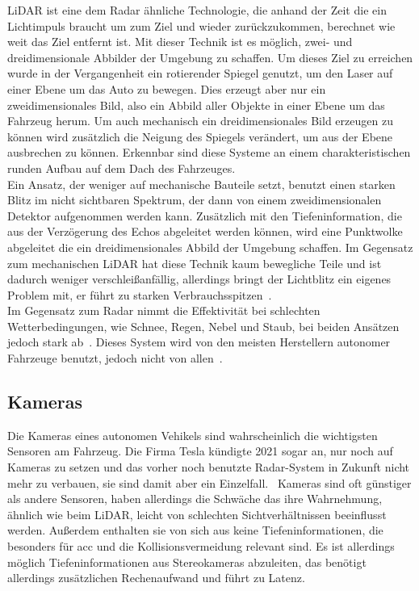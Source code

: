 \documentclass[conference,compsoc,final,a4paper]{IEEEtran}
\begin{document}
\ac{LiDAR} ist eine dem Radar ähnliche Technologie, die anhand der Zeit die ein Lichtimpuls braucht um zum Ziel und wieder zurückzukommen, berechnet wie weit das Ziel entfernt ist.
Mit dieser Technik ist es möglich, zwei- und dreidimensionale Abbilder der Umgebung zu schaffen.
Um dieses Ziel zu erreichen wurde in der Vergangenheit ein rotierender Spiegel genutzt, um den Laser auf einer Ebene um das Auto zu bewegen.
Dies erzeugt aber nur ein zweidimensionales Bild, also ein Abbild aller Objekte in einer Ebene um das Fahrzeug herum.
Um auch mechanisch ein dreidimensionales Bild erzeugen zu können wird zusätzlich die Neigung des Spiegels verändert, um aus der Ebene ausbrechen zu können.
Erkennbar sind diese Systeme an einem charakteristischen runden Aufbau auf dem Dach des Fahrzeuges.\\
Ein Ansatz, der weniger auf mechanische Bauteile setzt, benutzt einen starken Blitz im nicht sichtbaren Spektrum, der dann von einem zweidimensionalen Detektor aufgenommen werden kann.
Zusätzlich mit den Tiefeninformation, die aus der Verzögerung des Echos abgeleitet werden können, wird eine Punktwolke abgeleitet die ein dreidimensionales Abbild der Umgebung
schaffen. Im Gegensatz zum mechanischen \ac{LiDAR} hat diese Technik kaum bewegliche Teile und ist dadurch weniger verschleißanfällig, allerdings bringt der Lichtblitz ein eigenes Problem mit,
er führt zu starken Verbrauchsspitzen~\cite{Zhaohua2020}.\\
Im Gegensatz zum Radar nimmt die Effektivität bei schlechten Wetterbedingungen, wie Schnee, Regen, Nebel und Staub, bei beiden Ansätzen jedoch stark ab~\cite{Neal2018}.
Dieses System wird von den meisten Herstellern autonomer Fahrzeuge benutzt, jedoch nicht von allen~\cite{Dickson2021}.

\subsection{Kameras}

Die Kameras eines autonomen Vehikels sind wahrscheinlich die wichtigsten Sensoren am Fahrzeug.
Die Firma Tesla kündigte 2021 sogar an, nur noch auf Kameras zu setzen und das vorher noch benutzte Radar-System in Zukunft nicht mehr zu verbauen, sie sind damit aber ein Einzelfall.~\cite{Koellner2022}
Kameras sind oft günstiger als andere Sensoren, haben allerdings die Schwäche das ihre Wahrnehmung, ähnlich wie beim LiDAR, leicht von schlechten Sichtverhältnissen beeinflusst werden.
Außerdem enthalten sie von sich aus keine Tiefeninformationen, die besonders für \ac{acc} und die Kollisionsvermeidung relevant sind.
Es ist allerdings möglich Tiefeninformationen aus Stereokameras abzuleiten, das benötigt allerdings zusätzlichen Rechenaufwand und führt zu Latenz.~\cite{Petit2022}\par
\end{document}
